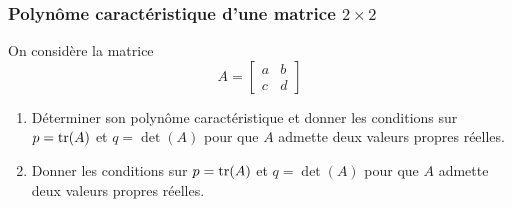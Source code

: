 \subsubsection{Polynôme caractéristique d'une matrice $2 \times 2$}

On considère la matrice 
  $$
  A = \left[\begin{array}{cc} a & b \\ c & d\end{array}\right]
  $$
  
  \begin{enumerate}
  \item Déterminer son polynôme caractéristique et donner les conditions sur $p = \operatorname{tr}(A)$ et $q = \det(A)$ pour que $A$ admette deux valeurs propres réelles.
  \item Donner les conditions sur $p = \operatorname{tr}(A)$ et $q = \det(A)$ pour que $A$ admette deux valeurs propres réelles.
\end{enumerate}
